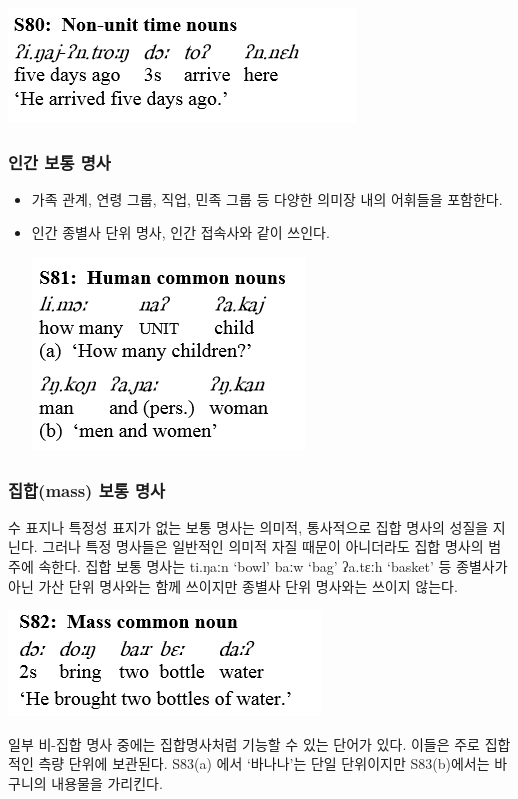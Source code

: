 \includegraphics{Pacoh/src/PacohS80.png}

\subsubsection{인간 보통 명사}
\begin{itemize}
\item 가족 관계, 연령 그룹, 직업, 민족 그룹 등 다양한 의미장 내의 어휘들을 포함한다.
\item 인간 종별사 단위 명사, 인간 접속사와 같이 쓰인다.

\includegraphics{Pacoh/src/PacohS81.png}

\end{itemize}

\subsubsection{집합(mass) 보통 명사}
수 표지나 특정성 표지가 없는 보통 명사는 의미적, 통사적으로 집합 명사의 성질을 지닌다.
그러나 특정 명사들은 일반적인 의미적 자질 때문이 아니더라도 집합 명사의 범주에 속한다.
집합 보통 명사는 ti.ŋaːn `bowl' baːw `bag' ʔa.tɛːh `basket' 등 종별사가 아닌 가산 단위 명사와는 함께 쓰이지만 종별사 단위 명사와는 쓰이지 않는다.

\includegraphics{Pacoh/src/PacohS82.png}

일부 비-집합 명사 중에는 집합명사처럼 기능할 수 있는 단어가 있다. 이들은 주로 집합적인 측량 단위에 보관된다. S83(a) 에서 `바나나'는 단일 단위이지만 S83(b)에서는 바구니의 내용물을 가리킨다.

